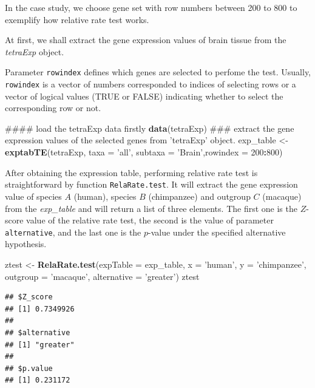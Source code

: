 \documentclass[]{book}
\newenvironment{Shaded}{\begin{snugshade}}{\end{snugshade}}
\newcommand{\DataTypeTok}[1]{\textcolor[rgb]{0.13,0.29,0.53}{#1}}
\newcommand{\DecValTok}[1]{\textcolor[rgb]{0.00,0.00,0.81}{#1}}
\newcommand{\KeywordTok}[1]{\textcolor[rgb]{0.13,0.29,0.53}{\textbf{#1}}}
\newcommand{\NormalTok}[1]{#1}
\newcommand{\OperatorTok}[1]{\textcolor[rgb]{0.81,0.36,0.00}{\textbf{#1}}}
\newcommand{\StringTok}[1]{\textcolor[rgb]{0.31,0.60,0.02}{#1}}
\begin{document}
In the case study, we choose gene set with row numbers between 200 to 800 to exemplify how relative rate test works.

At first, we shall extract the gene expression values of brain tissue from the \emph{tetraExp} object.

Parameter \texttt{rowindex} defines which genes are selected to perfome the test. Usually, \texttt{rowindex} is a vector of numbers corresponded to indices of selecting rows or a vector of logical values (TRUE or FALSE) indicating whether to select the corresponding row or not.

\begin{Shaded}
\begin{Highlighting}[]
\NormalTok{#### load the tetraExp data firstly}
\KeywordTok{data}\NormalTok{(tetraExp)}
\NormalTok{### extract the gene expression values of the selected genes from 'tetraExp' object.}
\NormalTok{exp_table <-}\KeywordTok{exptabTE}\NormalTok{(tetraExp, }\DataTypeTok{taxa =} \StringTok{'all'}\NormalTok{, }\DataTypeTok{subtaxa =} \StringTok{'Brain'}\NormalTok{,}\DataTypeTok{rowindex =} \DecValTok{200}\OperatorTok{:}\DecValTok{800}\NormalTok{)}
\end{Highlighting}
\end{Shaded}

After obtaining the expression table, performing relative rate test is straightforward by function \texttt{RelaRate.test}. It will extract the gene expression value of species \(A\) (human), species \(B\) (chimpanzee) and outgroup \(C\) (macaque) from the \emph{exp\_table} and will return a list of three elements. The first one is the \(Z\)-score value of the relative rate test, the second is the value of parameter \texttt{alternative}, and the last one is the \(p\)-value under the specified alternative hypothesis.

\begin{Shaded}
\begin{Highlighting}[]
\NormalTok{ztest <-}\StringTok{ }\KeywordTok{RelaRate.test}\NormalTok{(}\DataTypeTok{expTable =}\NormalTok{ exp_table, }\DataTypeTok{x =} \StringTok{'human'}\NormalTok{, }\DataTypeTok{y =} \StringTok{'chimpanzee'}\NormalTok{,}
                       \DataTypeTok{outgroup =} \StringTok{'macaque'}\NormalTok{, }\DataTypeTok{alternative =} \StringTok{'greater'}\NormalTok{)}
\NormalTok{ztest}
\end{Highlighting}
\end{Shaded}

\begin{verbatim}
## $Z_score
## [1] 0.7349926
## 
## $alternative
## [1] "greater"
## 
## $p.value
## [1] 0.231172
\end{verbatim}
\end{document}
